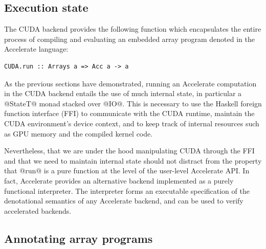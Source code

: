 %


\subsection{Execution state}

The CUDA backend provides the following function which encapsulates the entire
process of compiling and evaluating an embedded array program denoted in the
Accelerate language:
%
\begin{lstlisting}[style=haskell]
CUDA.run :: Arrays a => Acc a -> a
\end{lstlisting}
%
As the previous sections have demonstrated, running an Accelerate computation in
the CUDA backend entails the use of much internal state, in particular a
@StateT@ monad stacked over @IO@. This is necessary to use the Haskell foreign
function interface (FFI) to communicate with the CUDA runtime, maintain the
CUDA environment's device context, and to keep track of internal resources such
as GPU memory and the compiled kernel code.

Nevertheless, that we are under the hood manipulating CUDA through the FFI and
that we need to maintain internal state should not distract from the property
that @run@ is a pure function at the level of the user-level Accelerate
API\@. In fact, Accelerate provides an alternative backend implemented as a purely
functional interpreter. The interpreter forms an executable specification of the
denotational semantics of any Accelerate backend, and can be used to verify
accelerated backends.


\subsection{Annotating array programs}
\label{sec:annotating_array_programs}

